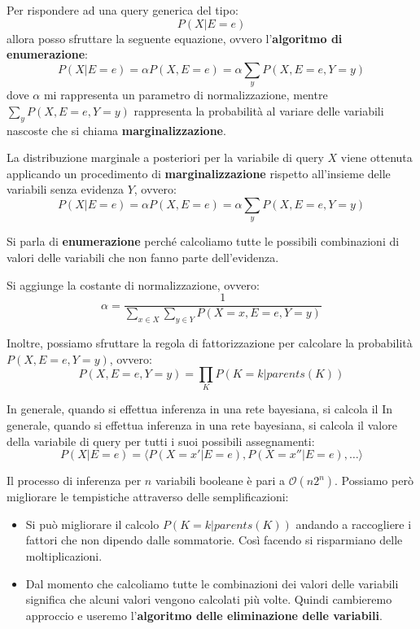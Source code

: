 Per rispondere ad una query generica del tipo:
\begin{equation*}
    P(X|E=e)
\end{equation*}
allora posso sfruttare la seguente equazione, ovvero l'\textbf{algoritmo di
    enumerazione}:
\begin{equation}
    P(X|E = e) = \alpha P(X,E = e) = \alpha \sum_{y} P(X,E = e, Y = y)
\end{equation}
dove $\alpha$ mi rappresenta un parametro di normalizzazione, mentre $\sum_{y}
    P(X,E = e, Y = y)$ rappresenta la probabilità al variare delle variabili nascoste
che si chiama \textbf{marginalizzazione}.

La distribuzione marginale a posteriori per la variabile di query $X$ viene
ottenuta applicando un procedimento di \textbf{marginalizzazione} rispetto all'insieme
delle variabili senza evidenza $Y$, ovvero:
\begin{equation}
    P(X|E = e) = \alpha P(X, E = e) = \alpha \sum_{y} P(X,E = e, Y = y)
\end{equation}

Si parla di \textbf{enumerazione} perché calcoliamo tutte le possibili combinazioni
di valori delle variabili che non fanno parte dell'evidenza.
\begin{nota}
    Si aggiunge la costante di normalizzazione, ovvero:
    \begin{equation}
        \alpha = \frac{1}{\sum_{x\in X}\sum_{y\in Y}P(X = x, E=e,Y=y)}
    \end{equation}
\end{nota}
Inoltre, possiamo sfruttare la regola di fattorizzazione per calcolare la probabilità
$P(X,E=e,Y=y)$, ovvero:
\begin{equation}
    P(X,E=e,Y=y) = \prod_{K} P(K=k | parents(K))
\end{equation}

In generale, quando si effettua inferenza in una rete bayesiana, si calcola il
In generale, quando si effettua inferenza in una rete bayesiana, si calcola il
valore della variabile di query per tutti i suoi possibili assegnamenti:
\begin{equation*}
    P(X|E=e) = \langle P(X = x'|E = e), P(X = x''|E = e),\dots \rangle
\end{equation*}

Il processo di inferenza per $n$ variabili booleane è pari a $\mathcal{O}(n2^n)$.
Possiamo però migliorare le tempistiche attraverso delle semplificazioni:
\begin{itemize}
    \item Si può migliorare il calcolo $P(K=k | parents(K))$ andando a raccogliere
          i fattori che non dipendo dalle sommatorie. Così facendo si risparmiano
          delle moltiplicazioni.
    \item Dal momento che calcoliamo tutte le combinazioni dei valori delle
          variabili significa che alcuni valori vengono calcolati più volte.
          Quindi cambieremo approccio e useremo l'\textbf{algoritmo delle
              eliminazione delle variabili}.
\end{itemize}

